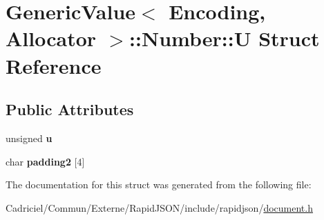 \hypertarget{struct_generic_value_1_1_number_1_1_u}{}\section{Generic\+Value$<$ Encoding, Allocator $>$\+:\+:Number\+:\+:U Struct Reference}
\label{struct_generic_value_1_1_number_1_1_u}
\subsection*{Public Attributes}
\begin{DoxyCompactItemize}
\item 
unsigned {\bfseries u}\hypertarget{struct_generic_value_1_1_number_1_1_u_a175e3a2bd43e6880791eb7c950d2f147}{}\label{struct_generic_value_1_1_number_1_1_u_a175e3a2bd43e6880791eb7c950d2f147}

\item 
char {\bfseries padding2} \mbox{[}4\mbox{]}\hypertarget{struct_generic_value_1_1_number_1_1_u_a9341f65c1645f24fd001a1ebf58d3c5b}{}\label{struct_generic_value_1_1_number_1_1_u_a9341f65c1645f24fd001a1ebf58d3c5b}

\end{DoxyCompactItemize}


The documentation for this struct was generated from the following file\+:\begin{DoxyCompactItemize}
\item 
Cadriciel/\+Commun/\+Externe/\+Rapid\+J\+S\+O\+N/include/rapidjson/\hyperlink{document_8h}{document.\+h}\end{DoxyCompactItemize}
